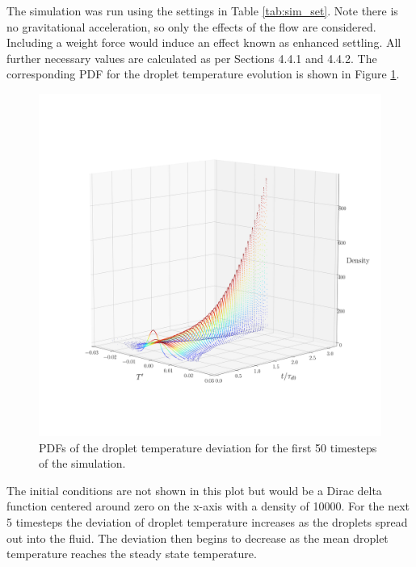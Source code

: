 \documentclass[../Interim_Report_Master]{subfiles}
\begin{document}
The simulation was run using the settings in Table \ref{tab:sim_set}. Note there is no gravitational acceleration, so only the effects of the flow are considered. Including a weight force would induce an effect known as enhanced settling. All further necessary values are calculated as per Sections 4.4.1 and 4.4.2. The corresponding PDF for the droplet temperature evolution is shown in Figure \ref{temp_pdf}.
\begin{figure}[h]
\centering %
\includegraphics[width=\textwidth, trim={0.8in 3in 0.5in 4in}, clip]{./Diagrams/Temperature_PDFs.png}
\caption{PDFs of the droplet temperature deviation for the first 50 timesteps of the simulation.}
\label{temp_pdf}
\end{figure}

The initial conditions are not shown in this plot but would be a Dirac delta function centered around zero on the x-axis with a density of 10000. For the next 5 timesteps the deviation of droplet temperature increases as the droplets spread out into the fluid. The deviation then begins to decrease as the mean droplet temperature reaches the steady state temperature. 
\end{document}
